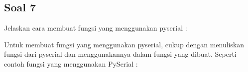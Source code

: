\subsection{Soal 7}
Jelaskan cara membuat fungsi yang menggunakan pyserial : 

Untuk membuat fungsi yang menggunakan pyserial, cukup dengan menuliskan fungsi dari pyserial dan menggunakannya dalam fungsi yang dibuat. Seperti contoh fungsi yang menggunakan PySerial : 

